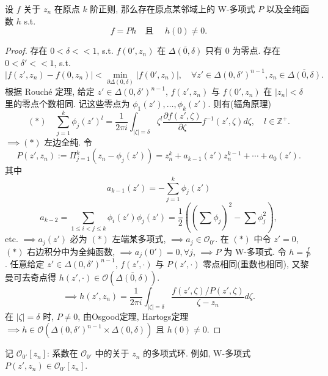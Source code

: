 \begin{theorem}[Weierstrass预备定理]
 设 $f$ 关于 $z_n$ 在原点 $k$ 阶正则, 那么存在原点某邻域上的 W-多项式 $P$ 以及全纯函数 $h$ s.t. 
  $$ f=Ph \quad \text{且 } \quad h(0) \neq 0.$$     
\end{theorem}
\begin{proof}
  存在 $0< \delta <<1$, s.t. $f(0',z_n)$ 在 $\overline{\Delta (0,\delta )}$  只有 $0$ 为零点.
  存在 $0<\delta ' <<1$, s.t. 
  $$ | f(z',z_n)-f(0,z_n) | < \min_{\partial \Delta (0,\delta )}|f(0',z_n)|, \quad \forall z' \in \Delta (0,\delta ')^{n-1}, z_n \in  \overline{\Delta (0,\delta )}.$$   
  根据 Rouch\'e 定理, 给定 $z' \in \Delta (0,\delta ')^{n-1}$, $f(z',z_n)$  与 $f(0',z_n)$ 在 $|z_n|< \delta $  里的零点个数相同.
  记这些零点为 $\phi _1(z'),\dots,\phi _k(z').$ 则有(辐角原理)
  $$(*) \quad \sum_{j=1}^{k}\phi _j(z')^l=\frac{1}{2 \pi i} \int_{|\zeta |=\delta } \zeta ^l \frac{\partial f(z',\zeta )}{\partial \zeta } f^{-1}(z',\zeta ) d \zeta , \quad l \in \mathbb{Z}^{+}.$$
  $\implies (*)$ 左边全纯.
  令 
  $$ P(z',z_n):= \Pi _{j=1}^{k}(z_n-\phi _j(z'))=z_{n}^{k}+a_{k-1}(z')z_{n}^{k-1}+ \cdots +a_0(z').$$
  其中
  $$ a_{k-1}(z')=- \sum_{j=1}^{k}\phi _j(z') $$
  $$ a_{k-2}=\sum_{1 \leq i<j \leq k}^{} \phi _i(z')\phi _j(z')=\frac{1}{2}\left( (\sum_{}^{} \phi _j)^2-\sum_{}^{}\phi _{j}^{2}\right), $$
  etc. $\implies a_j(z')$ 必为 $(*)$ 左端某多项式, $\implies a_j \in \mathcal{O}_{0'}$. 在 $(*)$ 中令 $z'=0$, $(*)$ 右边积分中为全纯函数, $\implies a_j(0')=0, \forall j$, $\implies P$ 为 W-多项式. 令 $h=\frac{f}{P}$. 任意给定 $z' \in \Delta (0,\delta ')^{n-1}$, $f(z',\cdot )$ 与 $P(z', \cdot )$ 零点相同(重数也相同), 又黎曼可去奇点得 $h(z',\cdot) \in \mathcal{O}(\overline{\Delta (0,\delta )})$.
  $$ \implies h(z',z_n)=\frac{1}{2 \pi i} \int_{|\zeta |=\delta } \frac{f(z',\zeta )/P(z',\zeta )}{\zeta -z_n} d \zeta .$$          
  在 $|\zeta |=\delta $ 时, $P \neq 0$, 由Osgood定理, Hartogs定理 $\implies h \in \mathcal{O}(\Delta (0,\delta ')^{n-1} \times \Delta (0,\delta ))$ 且 $h(0) \neq 0$.       
\end{proof}

\begin{definition}
记 $\mathcal{O}_{0'}[z_n]$: 系数在 $\mathcal{O}_{0'}$ 中的关于 $z_n$ 的多项式环. 例如, W-多项式 $P(z',z_n) \in \mathcal{O}_{0'}[z_n]$.    
\end{definition}

